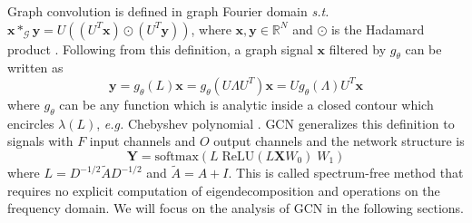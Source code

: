 \documentclass{article}
\newcommand\eg{\textit{e.g.}}
\newcommand\st{\textit{s.t.}}
\begin{document}
Graph convolution is defined in graph Fourier domain \st{} $\bm{x} *_{\mathcal{G}} \bm{y} = U((U^T \bm{x}) \odot (U^T\bm{y}))$, where $\bm{x}, \bm{y} \in \mathbb{R}^N$ and $\odot$ is the Hadamard product \cite{defferrard2016fast}. Following from this definition, a graph signal $\bm{x}$ filtered by $g_\theta$ can be written as
\begin{equation}\label{def}
    \bm{y} = g_\theta(L)\bm{x} = g_\theta(U \Lambda U^T) \bm{x} = U g_\theta(\Lambda) U^T \bm{x}
\end{equation}
where $g_\theta$ can be any function which is analytic inside a closed contour which encircles $\lambda(L)$, \eg{} Chebyshev polynomial \cite{defferrard2016fast}. GCN generalizes this definition to signals with $F$ input channels and $O$ output channels and the network structure is
\begin{equation}
    \label{eq0}
   \bm{Y} = \text{softmax} ({L} \; \text{ReLU} ( L \bm{X} W_0 ) \; W_1 )
\end{equation}
where $L = D^{-1/2} \tilde{A} D^{-1/2}$ and $\tilde{A} = A+I$. This is called spectrum-free method \cite{bronstein2016geometric} that requires no explicit computation of eigendecomposition \cite{zhang2018graph} and operations on the frequency domain. We will focus on the analysis of GCN in the following sections.



\end{document}
